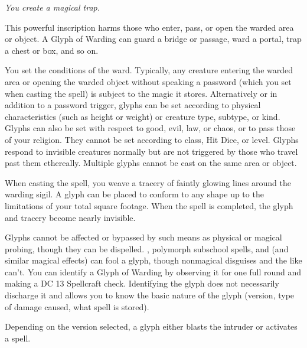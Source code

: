 \emph{You create a magical trap.}

This powerful inscription harms those who enter, pass, or open the warded area or object. 
A Glyph of Warding can guard a bridge or passage, ward a portal, trap a chest or box, and so on.

You set the conditions of the ward. 
Typically, any creature entering the warded area or opening the warded object without speaking a password (which you set when casting the spell) is subject to the magic it stores. 
Alternatively or in addition to a password trigger, glyphs can be set according to physical characteristics (such as height or weight) or creature type, subtype, or kind. 
Glyphs can also be set with respect to good, evil, law, or chaos, or to pass those of your religion. 
They cannot be set according to class, Hit Dice, or level. 
Glyphs respond to invisible creatures normally but are not triggered by those who travel past them ethereally. 
Multiple glyphs cannot be cast on the same area or object.

When casting the spell, you weave a tracery of faintly glowing lines around the warding sigil. 
A glyph can be placed to conform to any shape up to the limitations of your total square footage. 
When the spell is completed, the glyph and tracery become nearly invisible.

Glyphs cannot be affected or bypassed by such means as physical or magical probing, though they can be dispelled. 
, polymorph subschool spells, and  (and similar magical effects) can fool a glyph, though nonmagical disguises and the like can't. 
You can identify a Glyph of Warding by observing it for one full round and making a DC 13 Spellcraft check. 
Identifying the glyph does not necessarily discharge it and allows you to know the basic nature of the glyph (version, type of damage caused, what spell is stored).

Depending on the version selected, a glyph either blasts the intruder or activates a spell.

